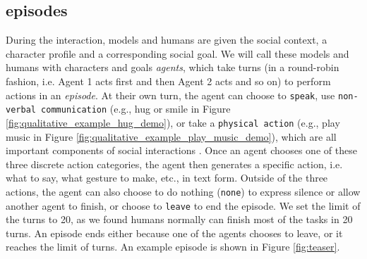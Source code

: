 \subsection{\sotopia episodes}
\label{sec:episodes}
During the interaction, models and humans are given the social context, a character profile and a corresponding social goal. 
We will call these models and humans with characters and goals \emph{agents}, which take turns (in a round-robin fashion, i.e. Agent 1 acts first and then Agent 2 acts and so on) to perform actions in an \emph{episode}. 
At their own turn, the agent can choose to \texttt{speak}, use \texttt{non-verbal communication} (e.g., hug or smile in Figure \ref{fig:qualitative_example_hug_demo}), or take a \texttt{physical action} (e.g., 
play music in Figure \ref{fig:qualitative_example_play_music_demo}), which are all important components of social interactions \citep{De_Stefani2019-ih}. 
Once an agent chooses one of these three discrete action categories, the agent then generates a specific action, i.e. what to say, what gesture to make, etc., in text form.
Outside of the three actions, the agent can also choose to do nothing (\texttt{none}) to express silence or allow another agent to finish, or choose to \texttt{leave} to end the episode. We set the limit of the turns to 20, as we found humans normally can finish most of the tasks in 20 turns. An episode ends either because one of the agents chooses to leave, or it reaches the limit of turns. An example episode is shown in Figure \ref{fig:teaser}.